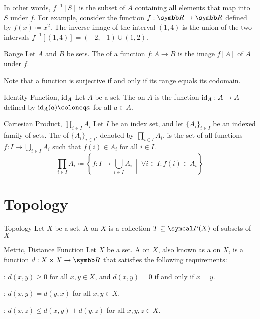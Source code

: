 \documentclass[12pt]{report}
\begin{document}
In other words, $f^{-1}[S]$ is the subset of $A$ containing all elements that map into $S$ under $f$. For example, consider the function $f: \R \to \R$ defined by $f(x) \coloneq x^2$. The inverse image of the interval $(1, 4)$ is the union of the two intervals $f^{-1}[(1, 4)] = (-2, -1) \cup (1, 2)$.

\begin{dfnbox}{Range}
	Let $A$ and $B$ be sets. The  of a function $f: A \to B$ is the image $f[A]$ of $A$ under $f$.
\end{dfnbox}

Note that a function is surjective if and only if its range equals its codomain.

\begin{dfnbox}{Identity Function, $\operatorname{id}_A$}
	Let $A$ be a set. The  on $A$ is the function $\operatorname{id}_A: A \to A$ defined by $\id_A(a) \coloneq a$ for all $a \in A$.
\end{dfnbox}

\begin{dfnbox}{Cartesian Product, $\prod_{i \in I} A_i$}
	Let $I$ be an index set, and let $\{ A_i \}_{i \in I}$ be an indexed family of sets. The  of $\{ A_i \}_{i \in I}$, denoted by $\prod_{i \in I} A_i$, is the set of all functions $f: I \to \bigcup_{i \in I} A_i$ such that $f(i) \in A_i$ for all $i \in I$.
	\[ \prod_{i \in I} A_i \coloneq \left\{ f: I \to \bigcup_{i \in I} A_i \ \middle|\ \forall i \in I : f(i) \in A_i \right\} \]
\end{dfnbox}



\chapter{Topology}

\begin{dfnbox}{Topology}
	Let $X$ be a set. A  on $X$ is a collection $T \subseteq \powerset(X)$ of subsets of $X$
\end{dfnbox}

\begin{dfnbox}{Metric, Distance Function}
	Let $X$ be a set. A  on $X$, also known as a  on $X$, is a function $d: X \times X \to \R$ that satisfies the following requirements:
	\begin{boxitems}
		\item {}: $d(x, y) \ge 0$ for all $x, y \in X$, and $d(x, y) = 0$ if and only if $x = y$.
		\item {}: $d(x, y) = d(y, x)$ for all $x, y \in X$.
		\item {}: $d(x, z) \le d(x, y) + d(y, z)$ for all $x, y, z \in X$.
	\end{boxitems}
\end{dfnbox}
\end{document}
